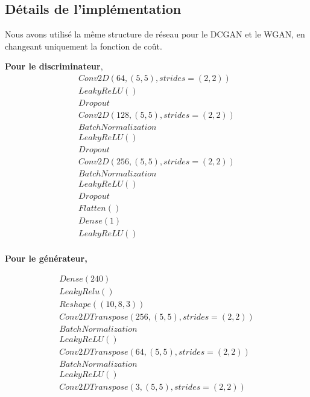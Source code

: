 \subsection{Détails de l'implémentation}

Nous avons utilisé la même structure de réseau pour le DCGAN et le WGAN, en changeant uniquement la fonction de coût.


\textbf{Pour le discriminateur},
\[ \begin{array}{lcr}
Conv2D(64, (5,5), strides=(2,2)) \\
LeakyReLU() \\
Dropout\\

Conv2D(128, (5,5), strides=(2,2)) \\
BatchNormalization\\
LeakyReLU()\\
Dropout\\

Conv2D(256, (5,5), strides=(2,2)) \\
BatchNormalization\\
LeakyReLU()\\
Dropout\\


Flatten()\\
Dense(1)\\
LeakyReLU()\\

\end{array}\]

\textbf{Pour le générateur,} 

\[ \begin{array}{lcr}
Dense(240)\\
LeakyRelu()\\
Reshape((10, 8, 3))\\

Conv2DTranspose(256, (5,5), strides=(2,2)) \\
BatchNormalization\\
LeakyReLU() \\


Conv2DTranspose(64, (5,5), strides=(2,2)) \\
BatchNormalization\\
LeakyReLU() \\

Conv2DTranspose(3, (5,5), strides=(2,2)) \\

\end{array}\]

